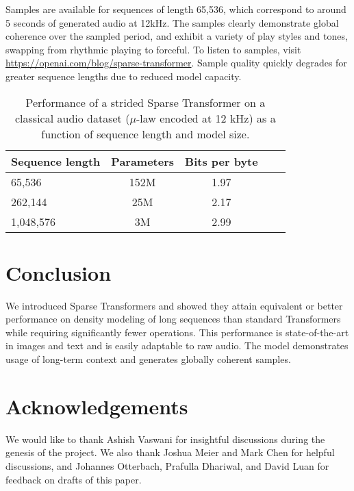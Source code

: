 \documentclass{article}
\begin{document}
Samples are available for sequences of length 65,536, which correspond to around 5 seconds of generated audio at 12kHz. The samples clearly demonstrate global coherence over the sampled period, and exhibit a variety of play styles and tones, swapping from rhythmic playing to forceful. To listen to samples, visit \url{https://openai.com/blog/sparse-transformer}. Sample quality quickly degrades for greater sequence lengths due to reduced model capacity. 

\begin{table}[h]
\caption{Performance of a strided Sparse Transformer on a classical audio dataset ($\mu$-law encoded at 12 kHz) as a function of sequence length and model size.}
\label{audio}
\vskip 0.15in
\begin{center}
\begin{small}
\begin{tabular}{lcccr}
\toprule
Sequence length & Parameters & Bits per byte \\
\midrule
65,536 & 152M & 1.97 \\
262,144 & 25M & 2.17 \\
1,048,576 & 3M & 2.99 \\

\bottomrule
\end{tabular}
\end{small}
\end{center}
\vskip -0.1in
\end{table}

\section{Conclusion}
We introduced Sparse Transformers and showed they attain equivalent or better performance on density modeling of long sequences than standard Transformers while requiring significantly fewer operations. This performance is state-of-the-art in images and text and is easily adaptable to raw audio. The model demonstrates usage of long-term context and generates globally coherent samples.

\section{Acknowledgements}
We would like to thank Ashish Vaswani for insightful discussions during the genesis of the project. We also thank Joshua Meier and Mark Chen for helpful discussions, and Johannes Otterbach, Prafulla Dhariwal, and David Luan for feedback on drafts of this paper.

\nocite{chen2017pixelsnail}
\nocite{salimans2017pixelcnn++}



\end{document}
